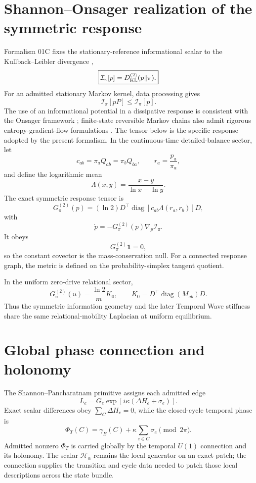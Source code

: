 \documentclass[11pt]{book}
\begin{document}
\section{Shannon--Onsager realization of the symmetric response}
Formalism 01C fixes the stationary-reference informational scalar to the Kullback--Leibler divergence \cite{KullbackLeibler1951},
\[
\boxed{
\mathcal I_\pi[p]=D_{\rm KL}^{(2)}(p\|\pi).
}
\]
For an admitted stationary Markov kernel, data processing gives
\[
\mathcal I_\pi[pP]\le\mathcal I_\pi[p].
\]
The use of an informational potential in a dissipative response is consistent with the Onsager framework \cite{Onsager1931}; finite-state reversible Markov chains also admit rigorous entropy-gradient-flow formulations \cite{Maas2011}. The tensor below is the specific response adopted by the present formalism. In the continuous-time detailed-balance sector, let
\[
c_{ab}=\pi_aQ_{ab}=\pi_bQ_{ba},
\qquad
r_a=\frac{p_a}{\pi_a},
\]
and define the logarithmic mean
\[
\Lambda(x,y)=\frac{x-y}{\ln x-\ln y}.
\]
The exact symmetric response tensor is
\[
\boxed{
G^{(2)}_\pi(p)
=(\ln2)D^\top
\operatorname{diag}[c_{ab}\Lambda(r_a,r_b)]D,
}
\]
with
\[
\boxed{
\dot p=-G^{(2)}_\pi(p)\nabla_p\mathcal I_\pi.
}
\]
It obeys
\[
G^{(2)}_\pi\mathbf1=0,
\]
so the constant covector is the mass-conservation null. For a connected response graph, the metric is defined on the probability-simplex tangent quotient.

In the uniform zero-drive relational sector,
\[
\boxed{
G^{(2)}_u(u)=\frac{\ln2}{m}K_0,
\qquad
K_0=D^\top\operatorname{diag}(M_{ab})D.
}
\]
Thus the symmetric information geometry and the later Temporal Wave stiffness share the same relational-mobility Laplacian at uniform equilibrium.

\section{Global phase connection and holonomy}
The Shannon--Pancharatnam primitive assigns each admitted edge
\[
L_e=G_e\exp\!\left[i\kappa(\Delta H_e+\sigma_e)\right].
\]
Exact scalar differences obey \(\sum_C\Delta H_e=0\), while the closed-cycle temporal phase is
\[
\boxed{
\Phi_T(C)=\gamma_B(C)+\kappa\sum_{e\in C}\sigma_e\pmod{2\pi}.
}
\]
Admitted nonzero \(\Phi_T\) is carried globally by the temporal \(U(1)\) connection and its holonomy. The scalar \(\mathcal H_\alpha\) remains the local generator on an exact patch; the connection supplies the transition and cycle data needed to patch those local descriptions across the state bundle.
\end{document}
